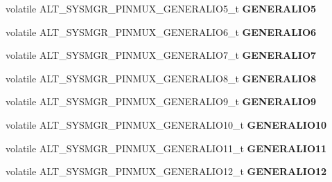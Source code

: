 \begin{DoxyCompactItemize}
volatile A\+L\+T\+\_\+\+S\+Y\+S\+M\+G\+R\+\_\+\+P\+I\+N\+M\+U\+X\+\_\+\+G\+E\+N\+E\+R\+A\+L\+I\+O5\+\_\+t {\bfseries G\+E\+N\+E\+R\+A\+L\+I\+O5}
\item 
\mbox{\label{structALT__SYSMGR__PINMUX__s_a537e67cffa759499034f2799672f6e51}} 
volatile A\+L\+T\+\_\+\+S\+Y\+S\+M\+G\+R\+\_\+\+P\+I\+N\+M\+U\+X\+\_\+\+G\+E\+N\+E\+R\+A\+L\+I\+O6\+\_\+t {\bfseries G\+E\+N\+E\+R\+A\+L\+I\+O6}
\item 
\mbox{\label{structALT__SYSMGR__PINMUX__s_a941a2f2210ceed04c299c7009f1499c3}} 
volatile A\+L\+T\+\_\+\+S\+Y\+S\+M\+G\+R\+\_\+\+P\+I\+N\+M\+U\+X\+\_\+\+G\+E\+N\+E\+R\+A\+L\+I\+O7\+\_\+t {\bfseries G\+E\+N\+E\+R\+A\+L\+I\+O7}
\item 
\mbox{\label{structALT__SYSMGR__PINMUX__s_a41b85bc0c9b5ec40108cdab386ac82a4}} 
volatile A\+L\+T\+\_\+\+S\+Y\+S\+M\+G\+R\+\_\+\+P\+I\+N\+M\+U\+X\+\_\+\+G\+E\+N\+E\+R\+A\+L\+I\+O8\+\_\+t {\bfseries G\+E\+N\+E\+R\+A\+L\+I\+O8}
\item 
\mbox{\label{structALT__SYSMGR__PINMUX__s_aaac133a075cd3a5cc97f0ec5f565d1bd}} 
volatile A\+L\+T\+\_\+\+S\+Y\+S\+M\+G\+R\+\_\+\+P\+I\+N\+M\+U\+X\+\_\+\+G\+E\+N\+E\+R\+A\+L\+I\+O9\+\_\+t {\bfseries G\+E\+N\+E\+R\+A\+L\+I\+O9}
\item 
\mbox{\label{structALT__SYSMGR__PINMUX__s_a637a6ccf7ca65c79d5992ae54aa9eb94}} 
volatile A\+L\+T\+\_\+\+S\+Y\+S\+M\+G\+R\+\_\+\+P\+I\+N\+M\+U\+X\+\_\+\+G\+E\+N\+E\+R\+A\+L\+I\+O10\+\_\+t {\bfseries G\+E\+N\+E\+R\+A\+L\+I\+O10}
\item 
\mbox{\label{structALT__SYSMGR__PINMUX__s_aedeb129213135aa90de2e78b84d5bbd7}} 
volatile A\+L\+T\+\_\+\+S\+Y\+S\+M\+G\+R\+\_\+\+P\+I\+N\+M\+U\+X\+\_\+\+G\+E\+N\+E\+R\+A\+L\+I\+O11\+\_\+t {\bfseries G\+E\+N\+E\+R\+A\+L\+I\+O11}
\item 
\mbox{\label{structALT__SYSMGR__PINMUX__s_a7417ca404c5248ca338dbd3bd4d32b20}} 
volatile A\+L\+T\+\_\+\+S\+Y\+S\+M\+G\+R\+\_\+\+P\+I\+N\+M\+U\+X\+\_\+\+G\+E\+N\+E\+R\+A\+L\+I\+O12\+\_\+t {\bfseries G\+E\+N\+E\+R\+A\+L\+I\+O12}
\item 

\end{DoxyCompactItemize}
